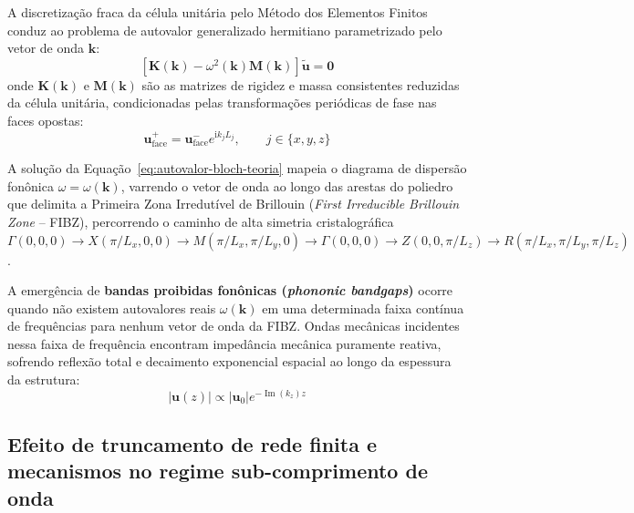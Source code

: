 A discretização fraca da célula unitária pelo Método dos Elementos Finitos conduz ao problema de autovalor generalizado hermitiano parametrizado pelo vetor de onda $\mathbf{k}$:
\begin{equation}
  \left[ \mathbf{K}(\mathbf{k}) - \omega^2(\mathbf{k}) \mathbf{M}(\mathbf{k}) \right] \tilde{\mathbf{u}} = \mathbf{0}
  \label{eq:autovalor-bloch-teoria}
\end{equation}
onde $\mathbf{K}(\mathbf{k})$ e $\mathbf{M}(\mathbf{k})$ são as matrizes de rigidez e massa consistentes reduzidas da célula unitária, condicionadas pelas transformações periódicas de fase nas faces opostas:
\begin{equation}
  \mathbf{u}_{\text{face}}^{+} = \mathbf{u}_{\text{face}}^{-} e^{\mathrm{i} k_j L_j}, \qquad j \in \{x, y, z\}
  \label{eq:pbc-fase-teoria}
\end{equation}

A solução da Equação~\eqref{eq:autovalor-bloch-teoria} mapeia o diagrama de dispersão fonônica $\omega = \omega(\mathbf{k})$, varrendo o vetor de onda ao longo das arestas do poliedro que delimita a Primeira Zona Irredutível de Brillouin (\textit{First Irreducible Brillouin Zone} -- FIBZ), percorrendo o caminho de alta simetria cristalográfica $\Gamma (0,0,0) \to X (\pi/L_x, 0, 0) \to M (\pi/L_x, \pi/L_y, 0) \to \Gamma (0,0,0) \to Z (0, 0, \pi/L_z) \to R (\pi/L_x, \pi/L_y, \pi/L_z)$.

A emergência de \textbf{bandas proibidas fonônicas (\textit{phononic bandgaps})} ocorre quando não existem autovalores reais $\omega(\mathbf{k})$ em uma determinada faixa contínua de frequências para nenhum vetor de onda da FIBZ. Ondas mecânicas incidentes nessa faixa de frequência encontram impedância mecânica puramente reativa, sofrendo reflexão total e decaimento exponencial espacial ao longo da espessura da estrutura:
\begin{equation}
  |\mathbf{u}(z)| \propto |\mathbf{u}_0| e^{-\operatorname{Im}(k_z) z}
  \label{eq:atenuacao-exp-teoria}
\end{equation}

\subsection{Efeito de truncamento de rede finita e mecanismos no regime sub-comprimento de onda}
\label{subsec:rede-finita-teoria}

